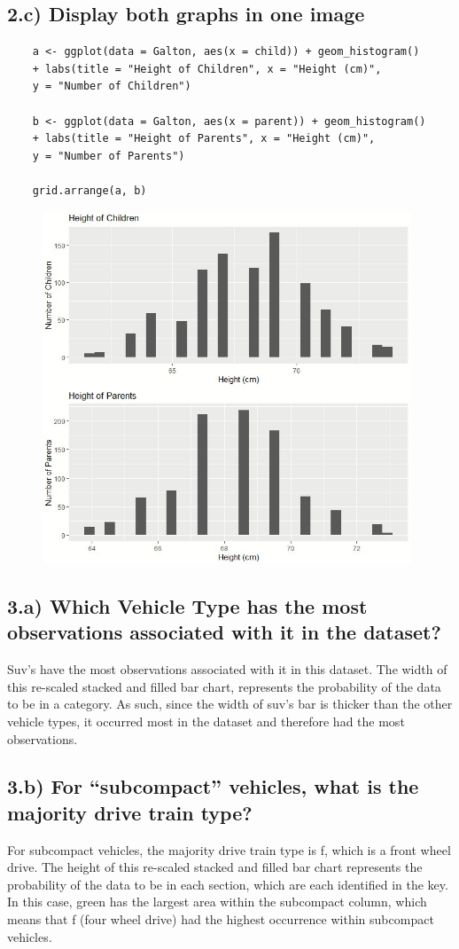 \documentclass[11pt]{article}
\begin{document}
\subsection*{2.c) Display both graphs in one image}
\begin{verbatim}
    a <- ggplot(data = Galton, aes(x = child)) + geom_histogram() 
    + labs(title = "Height of Children", x = "Height (cm)",
    y = "Number of Children")

    b <- ggplot(data = Galton, aes(x = parent)) + geom_histogram() 
    + labs(title = "Height of Parents", x = "Height (cm)", 
    y = "Number of Parents")

    grid.arrange(a, b)
\end{verbatim}

\begin{figure}[H]
\includegraphics[width = 11cm]{2c.jpg}
\centering
\end{figure}

\subsection*{3.a) Which Vehicle Type has the most observations associated with it in the dataset?}
Suv's have the most observations associated with it in this dataset. The width of this re-scaled stacked and filled bar chart, represents the probability of the data to be in a category. As such, since the width of suv's bar is thicker than the other vehicle types, it occurred most in the dataset and therefore had the most observations.

\subsection*{3.b) For “subcompact” vehicles, what is the majority drive train type?}
For subcompact vehicles, the majority drive train type is f, which is a front wheel drive. The height of this re-scaled stacked and filled bar chart represents the probability of the data to be in each section, which are each identified in the key. In this case, green has the largest area within the subcompact column, which means that f (four wheel drive) had the highest occurrence within subcompact vehicles.
\end{document}
